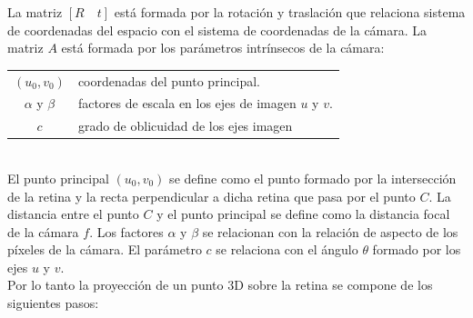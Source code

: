 La matriz $[R \quad t]$ está formada por la rotación y traslación que relaciona sistema de coordenadas del espacio con el sistema de coordenadas de la cámara. La matriz $A$ está formada por los parámetros intrínsecos de la cámara:\\



\begin{tabular}{cp{}}


$(u_0, v_0)$ &  coordenadas del punto principal. \\ 
$\alpha$ y $\beta$ & factores de escala en los ejes de imagen  $u$ y $v$. \\ 
$c$ & grado de oblicuidad de los ejes imagen
\end{tabular} \\

El punto principal $(u_0, v_0)$ se define como el punto formado por la intersección de la retina y la recta perpendicular a dicha retina que pasa por el punto $C$. La distancia entre el punto $C$ y el punto principal se define como la distancia focal de la cámara $f$. Los factores $\alpha$ y $\beta$ se relacionan con la relación de aspecto de los píxeles de la cámara. El parámetro $c$ se relaciona con el ángulo $\theta$ formado por los ejes $u$ y $v$.\\

Por lo tanto la proyección de un punto 3D sobre la retina se compone de los siguientes pasos:\\

